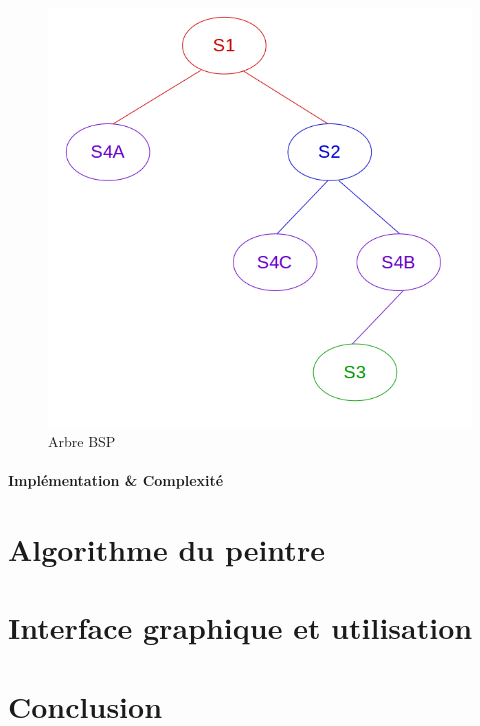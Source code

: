 \documentclass[11pt,a4paper]{article}
\begin{document}
\begin{figure}[!h]
\centering
\includegraphics[scale=0.4]{free_splits_3.png}
\caption{Arbre BSP}
\label{split_bsp}
\end{figure}

\paragraph{Implémentation \& Complexité}

\section{Algorithme du peintre}

\section{Interface graphique et utilisation}

\section*{Conclusion}
\end{document}
